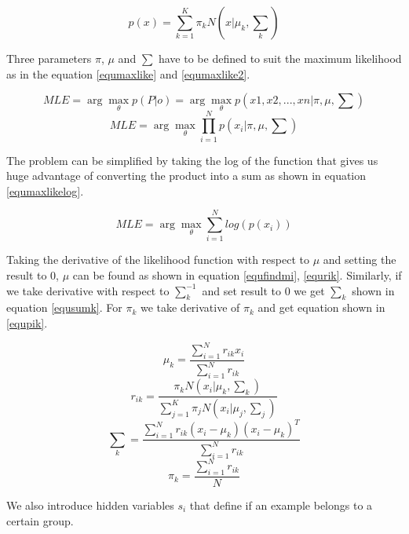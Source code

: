 \documentclass[conference]{IEEEtran}
\begin{document}
\begin{equation}\label{equmixdist}
	p(x) = \sum_{k=1}^K {\pi_k N(x|\mu_k, {\sum}_k)}
\end{equation}

Three parameters $\pi$, $\mu$ and $\sum$ have to be defined to suit the maximum likelihood as in the equation \ref{equmaxlike}
and \ref{equmaxlike2}.

\begin{equation}\label{equmaxlike}
	MLE=\arg\max_\theta {p(P|o)} = \arg\max_\theta {p({x1,x2,...,xn}|\pi,\mu,\sum)}
\end{equation}
\begin{equation}\label{equmaxlike2}
	MLE = \arg\max_\theta {\prod_{i=1}^N p(x_i|\pi,\mu,\sum)}
\end{equation}

The problem can be simplified by taking the log of the function that gives us huge advantage of converting the
product into a sum as shown in equation \ref{equmaxlikelog}.

\begin{equation}\label{equmaxlikelog}
	MLE=\arg\max_\theta {\sum_{i=1}^N log(p(x_i))}
\end{equation}

Taking the derivative of the likelihood function with respect to $\mu$ and setting the result to 0, $\mu$ can be found as
shown in equation \ref{equfindmi}, \ref{equrik}. Similarly, if we take derivative with respect to $\sum_k^{-1}$ and set
result to 0 we get $\sum_k$ shown in equation \ref{equsumk}. For $\pi_k$ we take derivative of $\pi_k$ and get equation
shown in \ref{equpik}.

\begin{equation}\label{equfindmi}
	\mu_k = \frac {\sum_{i=1}^N r_{ik} x_i} {\sum_{i=1}^N r_{ik}}
\end{equation}
\begin{equation}\label{equrik}
	r_{ik} = \frac {\pi_k N(x_i|\mu_k,{\sum}_k)} {\sum_{j=1}^K \pi_j N(x_i|\mu_j,{\sum}_j)}
\end{equation}
\begin{equation}\label{equsumk}
	 {\sum}_k = \frac {\sum_{i=1}^N r_{ik} (x_i-\mu_k) (x_i-\mu_k)^T} {\sum_{i=1}^N r_{ik}}
\end{equation}
\begin{equation}\label{equpik}
	\pi_k=\frac {\sum_{i=1}^N r_{ik}} {N}
\end{equation}

We also introduce hidden variables $s_i$ that define if an example belongs to a certain group.
\end{document}
